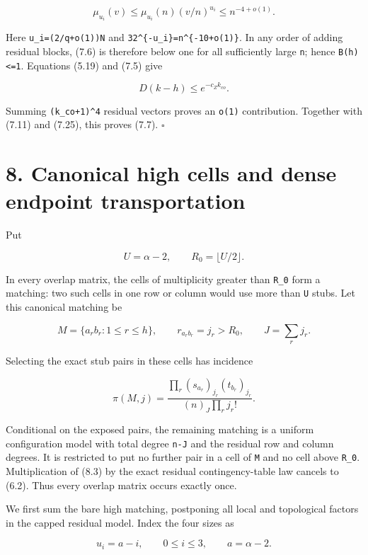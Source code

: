 \documentclass[
  11pt,
  a4paper,
]{article}
\begin{document}
\[
 \mu_{u_i}(v)\le\mu_{u_i}(n)(v/n)^{u_i}\le n^{-4+o(1)}. \tag{7.26}
\]

Here \texttt{u\_i=(2/q+o(1))N} and
\texttt{32\^{}\{-u\_}\allowbreak{}\texttt{i\}=}\allowbreak{}\texttt{n\^{}\{-10+}\allowbreak{}\texttt{o(1)}\allowbreak{}\texttt{\}}.
In any order of adding residual blocks, (7.6) is therefore below one for
all sufficiently large \texttt{n}; hence \texttt{B(h)\textless{}=1}.
Equations (5.19) and (7.5) give

\[
 D(k-h)\le e^{-c_Zk_{co}}.                               \tag{7.27}
\]

Summing \texttt{(k\_co+1)\^{}4} residual vectors proves an \texttt{o(1)}
contribution. Together with (7.11) and (7.25), this proves (7.7).
\(\square\)

\section{8. Canonical high cells and dense endpoint
transportation}\label{canonical-high-cells-and-dense-endpoint-transportation}

Put

\[
 U=\alpha-2,\qquad R_0=\lfloor U/2\rfloor.                \tag{8.1}
\]

In every overlap matrix, the cells of multiplicity greater than
\texttt{R\_0} form a matching: two such cells in one row or column would
use more than \texttt{U} stubs. Let this canonical matching be

\[
 M=\{a_rb_r:1\le r\le h\},\qquad
 r_{a_rb_r}=j_r>R_0,\qquad J=\sum_rj_r.                  \tag{8.2}
\]

Selecting the exact stub pairs in these cells has incidence

\[
 \pi(M,j)=
 \frac{\prod_r(s_{a_r})_{j_r}(t_{b_r})_{j_r}}
      {(n)_J\prod_rj_r!}.                                \tag{8.3}
\]

Conditional on the exposed pairs, the remaining matching is a uniform
configuration model with total degree \texttt{n-J} and the residual row
and column degrees. It is restricted to put no further pair in a cell of
\texttt{M} and no cell above \texttt{R\_0}. Multiplication of (8.3) by
the exact residual contingency-table law cancels to (6.2). Thus every
overlap matrix occurs exactly once.

We first sum the bare high matching, postponing all local and
topological factors in the capped residual model. Index the four sizes
as

\[
 u_i=a-i,\qquad 0\le i\le3,\qquad a=\alpha-2.             \tag{8.4}
\]
\end{document}
